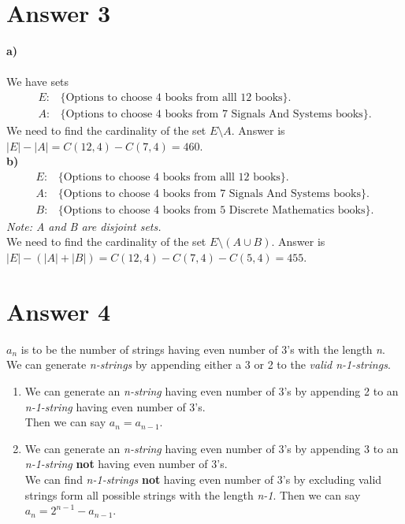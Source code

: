 \documentclass[12pt]{article}
\begin{document}
\section*{Answer 3}
\textbf{a)}\\ \\
We have sets
\begin{align*} 
	E: & \{\text{Options to choose 4 books from alll 12 books}\}.\\
	A: & \{\text{Options to choose 4 books from 7 Signals And Systems books}\}.
\end{align*}
We need to find the cardinality of the set $E\setminus A$.
Answer is $\left\vert{E}\right\vert - \left\vert{A}\right\vert = C(12,4)-C(7,4) = 460$.\\
\textbf{b)}
\begin{align*} 
	E: & \{\text{Options to choose 4 books from alll 12 books}\}.\\
	A: & \{\text{Options to choose 4 books from 7 Signals And Systems books}\}.\\
	B: & \{\text{Options to choose 4 books from 5 Discrete Mathematics books}\}.
\end{align*}
\textit{Note: A and B are disjoint sets.}\\
We need to find the cardinality of the set $E\setminus (A\cup B)$.
Answer is $\left\vert{E}\right\vert - (\left\vert{A}\right\vert + \left\vert{B}\right\vert)=C(12,4)-C(7,4) - C(5,4) = 455$.\\

\section*{Answer 4}

$a_n$ is to be the number of strings having even number of 3's with the length \textit{n}.\\
We can generate \textit{n-strings} by appending either a 3 or 2 to the \textit{valid n-1-strings}.
\begin{enumerate}
\item
	We can generate an \textit{n-string} having even number of 3's by appending 2 to an \textit{n-1-string} having even number of 3's.\\
Then we can say $a_n=a_{n-1}$.
\item
	We can generate an \textit{n-string} having even number of 3's by appending 3 to an \textit{n-1-string} \textbf{not} having even number of 3's.\\
We can find \textit{n-1-strings} \textbf{not} having even number of 3's by excluding valid strings form all possible strings with the length \textit{n-1}.
Then we can say $a_n=2^{n-1}-a_{n-1}$.
\end{enumerate}
\end{document}
